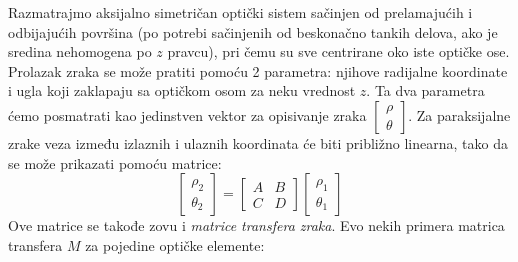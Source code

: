 \documentclass[fleqn]{report}
\begin{document}
Razmatrajmo aksijalno simetričan optički sistem sačinjen od prelamajućih i odbijajućih površina (po potrebi sačinjenih od beskonačno tankih delova, ako je sredina nehomogena po $z$ pravcu), pri čemu su sve centrirane oko iste optičke ose.
Prolazak zraka se može pratiti pomoću 2 parametra: njihove radijalne koordinate i ugla koji zaklapaju sa optičkom osom za neku vrednost $z$.
Ta dva parametra ćemo posmatrati kao jedinstven vektor za opisivanje zraka $
    \begin{bmatrix}
        \rho \\
        \theta
    \end{bmatrix}
$.
Za paraksijalne zrake veza između izlaznih i ulaznih koordinata će biti približno linearna, tako da se može prikazati pomoću matrice:
\begin{equation*}
    \begin{bmatrix} \rho_2 \\ \theta_2 \end{bmatrix} = \begin{bmatrix}
        A & B \\ C & D
    \end{bmatrix} \begin{bmatrix} \rho_1 \\ \theta_1 \end{bmatrix}
\end{equation*}
Ove matrice se takođe zovu i \emph{matrice transfera zraka}. Evo nekih primera matrica transfera $M$ za pojedine optičke elemente:
\end{document}
